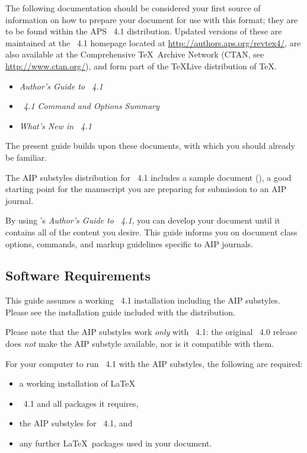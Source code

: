 \documentclass[%
 reprint,%
 amssymb, amsmath,%
 aip,cha,%
]{revtex4-1}
\begin{document}
The following documentation should be considered your first source of information 
on how to prepare your document for use with this format; 
they are to be found within the APS \revtex~4.1 distribution. 
Updated versions of these are maintained at
the \revtex~4.1 homepage located at \url{http://authors.aps.org/revtex4/},
are also available at the Comprehensive \TeX\ Archive Network (CTAN, see \url{http://www.ctan.org/}), 
and form part of the \TeX Live distribution of \TeX.
\begin{itemize}
\item \textit{Author's Guide to \revtex~4.1}
\item \textit{\revtex~4.1 Command and Options Summary}
\item \textit{What's New in \revtex~4.1}
\end{itemize}
The present guide builds upon these documents, with which you should already be familiar.

The AIP substyles distribution for \revtex~4.1 includes 
a sample document (), 
a good starting point for 
the manuscript you are preparing for submission to an AIP journal.

By using \revtex's \textit{Author's Guide to \revtex~4.1}, you can develop your
document until it contains all of the content you desire.
This guide informs you on document class options, commands, and 
markup guidelines specific to AIP journals. 

\subsection{Software Requirements}

This guide assumes a working \revtex~4.1 installation including the AIP substyles. 
Please see the installation guide included with the distribution.\cite{Note1}

Please note that the AIP substyles work {\it only} with \revtex~4.1: 
the original \revtex~4.0 release does {\it not} make the AIP substyle available, nor is it compatible with them. 

For your computer to run \revtex~4.1 with the AIP substyles, the following are required:
\begin{itemize}
\item
a working installation of \LaTeX\,
\item
\revtex~4.1 and all packages it requires,
\item
the AIP substyles for \revtex~4.1, and
\item
any further \LaTeX\ packages used in your document. 
\end{itemize}
\end{document}
